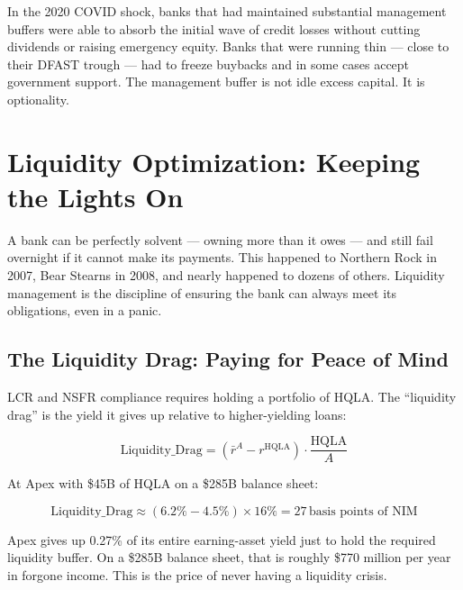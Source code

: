 \documentclass[12pt,a4paper]{article}
\begin{document}
\begin{mdframed}[style=casestudy]
In the 2020 COVID shock, banks that had maintained substantial management
buffers were able to absorb the initial wave of credit losses without cutting
dividends or raising emergency equity.  Banks that were running thin --- close
to their DFAST trough --- had to freeze buybacks and in some cases accept
government support.  The management buffer is not idle excess capital.
It is optionality.
\end{mdframed}

\section{Liquidity Optimization: Keeping the Lights On}

A bank can be perfectly solvent --- owning more than it owes --- and still
fail overnight if it cannot make its payments.  This happened to Northern
Rock in 2007, Bear Stearns in 2008, and nearly happened to dozens of others.
Liquidity management is the discipline of ensuring the bank can always meet
its obligations, even in a panic.

\subsection{The Liquidity Drag: Paying for Peace of Mind}

LCR and NSFR compliance requires holding a portfolio of HQLA.  The
``liquidity drag'' is the yield it gives up relative to higher-yielding loans:

\begin{equation}
  \text{Liquidity\_Drag} = (\bar{r}^A - r^{\text{HQLA}}) \cdot \frac{\text{HQLA}}{A}
\end{equation}

At Apex with \$45B of HQLA on a \$285B balance sheet:

\begin{equation}
  \text{Liquidity\_Drag} \approx (6.2\% - 4.5\%) \times 16\% = 27\, \text{basis points of NIM}
\end{equation}

\begin{mdframed}[style=plainenglish]
Apex gives up 0.27\% of its entire earning-asset yield just to hold the
required liquidity buffer.  On a \$285B balance sheet, that is roughly
\$770 million per year in forgone income.  This is the price of never having
a liquidity crisis.
\end{mdframed}
\end{document}
